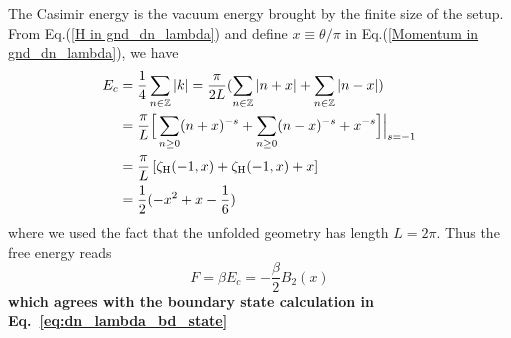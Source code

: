 The Casimir energy is the vacuum energy brought by the finite size of the setup. From Eq.(\ref{H in gnd_dn_lambda}) and define $x\equiv\theta/\pi$ in Eq.(\ref{Momentum in gnd_dn_lambda}), we have
\begin{equation}
\begin{aligned}
E_c &= \frac{1}{4} \sum_{n \in \mathbb{Z}} | k| = \frac{\pi}{2L} ( \sum_{n \in \mathbb{Z}}  | n + x | + \sum_{n \in \mathbb{Z}}  | n - x |  ) \\  
&= \frac{\pi}{L} \Big[\sum_{n \ge 0 } ( n + x )^{-s} + \sum_{n \ge 0 }  ( n - x)^{-s}  +   x^{-s} \Big]\Big|_{s = -1} \\
&= \frac{\pi}{L} \left[ \zeta_{\rm H}( -1, x ) + \zeta_{\rm H}( -1, x ) +  x \right] \\
&= \frac{1}{2} ( - x^2 + x - \frac{1}{6})
\end{aligned}
\end{equation}
where we used the fact that the unfolded geometry has length $L=2\pi$. Thus the free energy reads
\begin{equation}
F = \beta E_c = - \frac{\beta}{2} B_2( x) 
\end{equation}
{\bf\color{red}which agrees with the boundary state calculation in Eq.~\ref{eq:dn_lambda_bd_state}}

